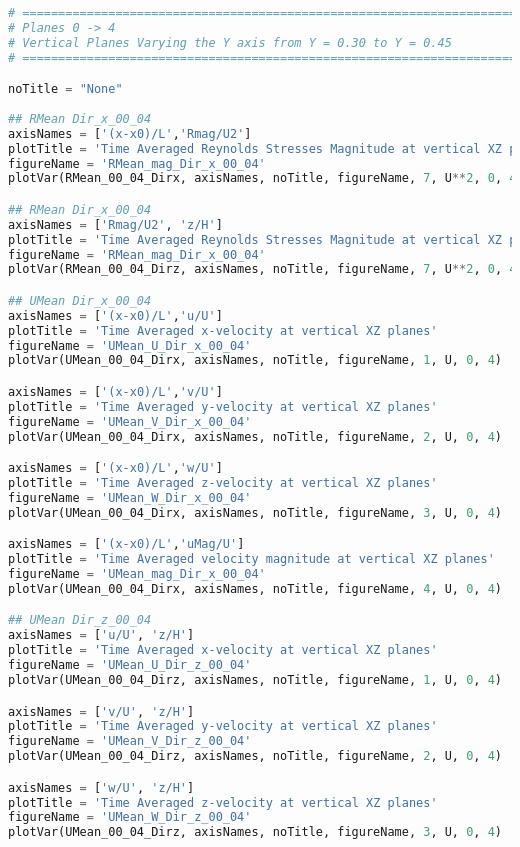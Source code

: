 \begin{lstlisting}[language=python]
# =============================================================================
# Planes 0 -> 4
# Vertical Planes Varying the Y axis from Y = 0.30 to Y = 0.45
# =============================================================================

noTitle = "None"
    
## RMean Dir_x_00_04
axisNames = ['(x-x0)/L','Rmag/U2']
plotTitle = 'Time Averaged Reynolds Stresses Magnitude at vertical XZ planes'
figureName = 'RMean_mag_Dir_x_00_04'
plotVar(RMean_00_04_Dirx, axisNames, noTitle, figureName, 7, U**2, 0, 4)

## RMean Dir_x_00_04
axisNames = ['Rmag/U2', 'z/H']
plotTitle = 'Time Averaged Reynolds Stresses Magnitude at vertical XZ planes'
figureName = 'RMean_mag_Dir_x_00_04'
plotVar(RMean_00_04_Dirz, axisNames, noTitle, figureName, 7, U**2, 0, 4)

## UMean Dir_x_00_04
axisNames = ['(x-x0)/L','u/U']
plotTitle = 'Time Averaged x-velocity at vertical XZ planes'
figureName = 'UMean_U_Dir_x_00_04'
plotVar(UMean_00_04_Dirx, axisNames, noTitle, figureName, 1, U, 0, 4)

axisNames = ['(x-x0)/L','v/U']
plotTitle = 'Time Averaged y-velocity at vertical XZ planes'
figureName = 'UMean_V_Dir_x_00_04'
plotVar(UMean_00_04_Dirx, axisNames, noTitle, figureName, 2, U, 0, 4)

axisNames = ['(x-x0)/L','w/U']
plotTitle = 'Time Averaged z-velocity at vertical XZ planes'
figureName = 'UMean_W_Dir_x_00_04'
plotVar(UMean_00_04_Dirx, axisNames, noTitle, figureName, 3, U, 0, 4)

axisNames = ['(x-x0)/L','uMag/U']
plotTitle = 'Time Averaged velocity magnitude at vertical XZ planes'
figureName = 'UMean_mag_Dir_x_00_04'
plotVar(UMean_00_04_Dirx, axisNames, noTitle, figureName, 4, U, 0, 4)

## UMean Dir_z_00_04
axisNames = ['u/U', 'z/H']
plotTitle = 'Time Averaged x-velocity at vertical XZ planes'
figureName = 'UMean_U_Dir_z_00_04'
plotVar(UMean_00_04_Dirz, axisNames, noTitle, figureName, 1, U, 0, 4)

axisNames = ['v/U', 'z/H']
plotTitle = 'Time Averaged y-velocity at vertical XZ planes'
figureName = 'UMean_V_Dir_z_00_04'
plotVar(UMean_00_04_Dirz, axisNames, noTitle, figureName, 2, U, 0, 4)

axisNames = ['w/U', 'z/H']
plotTitle = 'Time Averaged z-velocity at vertical XZ planes'
figureName = 'UMean_W_Dir_z_00_04'
plotVar(UMean_00_04_Dirz, axisNames, noTitle, figureName, 3, U, 0, 4)


\end{lstlisting}
